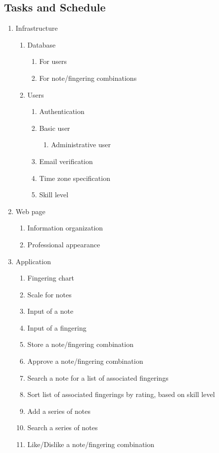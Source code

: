 \documentclass[12pt,english]{article}
\begin{document}
\subsection{Tasks and Schedule}
\begin{enumerate}
\item Infrastructure 

\begin{enumerate}
\item Database 

\begin{enumerate}
\item For users 
\item For note/fingering combinations 
\end{enumerate}
\item Users 

\begin{enumerate}
\item Authentication 
\item Basic user 

\begin{enumerate}
\item Administrative user 
\end{enumerate}
\item Email verification 
\item Time zone specification 
\item Skill level 
\end{enumerate}
\end{enumerate}
\item Web page 

\begin{enumerate}
\item Information organization 
\item Professional appearance 
\end{enumerate}
\item Application 

\begin{enumerate}
\item Fingering chart 
\item Scale for notes 
\item Input of a note 
\item Input of a fingering 
\item Store a note/fingering combination 
\item Approve a note/fingering combination 
\item Search a note for a list of associated fingerings 
\item Sort list of associated fingerings by rating, based on skill level 
\item Add a series of notes 
\item Search a series of notes 
\item Like/Dislike a note/fingering combination 
\end{enumerate}
\end{enumerate}
\end{document}
